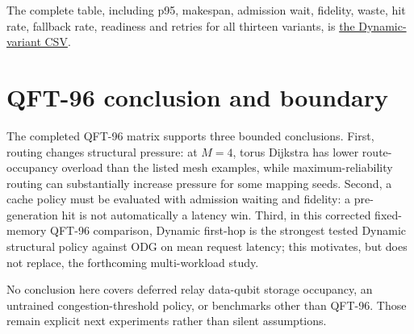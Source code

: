 The complete table, including p95, makespan, admission wait, fidelity, waste,
hit rate, fallback rate, readiness and retries for all thirteen variants, is
\href{https://github.com/sanjeevkrishnaa/Compiler-Driven-ACE/blob/codex/ace-scheduler-correctness/results/qft96_2seed_2026-10-26/figures/dynamic-variants/dynamic_variants_metrics.csv}{the Dynamic-variant CSV}.

\section{QFT-96 conclusion and boundary}

The completed QFT-96 matrix supports three bounded conclusions. First, routing
changes structural pressure: at $M=4$, torus Dijkstra has lower route-occupancy
overload than the listed mesh examples, while maximum-reliability routing can
substantially increase pressure for some mapping seeds. Second, a cache policy
must be evaluated with admission waiting and fidelity: a pre-generation hit is
not automatically a latency win. Third, in this corrected fixed-memory QFT-96
comparison, Dynamic first-hop is the strongest tested Dynamic structural policy
against ODG on mean request latency; this motivates, but does not replace, the
forthcoming multi-workload study.

No conclusion here covers deferred relay data-qubit storage occupancy, an
untrained congestion-threshold policy, or benchmarks other than QFT-96. Those
remain explicit next experiments rather than silent assumptions.
